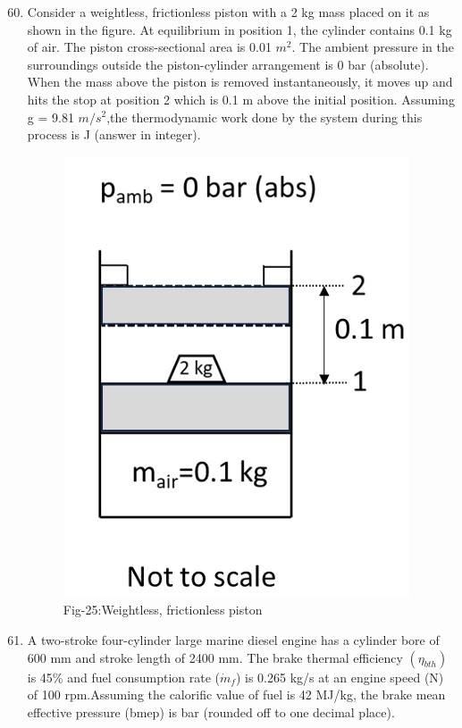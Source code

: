 \documentclass[journal]{IEEEtran}
\theoremstyle{remark}
\begin{document}
\begin{enumerate}[itemsep=1em]
\setcounter{enumi}{59}
\item Consider a weightless, frictionless piston with a 2 kg mass placed on it as shown in the figure. At equilibrium in position 1, the cylinder contains 0.1 kg of air. The piston cross-sectional area is 0.01 $m^2$. The ambient pressure in the surroundings outside the piston-cylinder arrangement is 0 bar (absolute). When the mass above the piston is removed instantaneously, it moves up and hits the stop at position 2 which is 0.1 m above the initial position. Assuming g = 9.81 $m/s^2$,the thermodynamic work done by the system during this process is \underline{\hspace{2cm}} J (answer in integer). 
\begin{figure}[H]
    \centering
    \includegraphics[width=0.3\columnwidth]{figs/fig-25.jpeg}
    \caption*{Fig-25:Weightless, frictionless piston}
    \label{fig:25}
\end{figure}
\end{enumerate}

\begin{enumerate}[itemsep=1em]
\setcounter{enumi}{60}
\item A two-stroke four-cylinder large marine diesel engine has a cylinder bore of 600 mm and stroke length of 2400 mm. The brake thermal efficiency $(\eta_{bth})$ is 45\% and fuel consumption rate ($\dot{m}_f$) is 0.265 kg/s at an engine speed (N) of 100 rpm.Assuming the calorific value of fuel is 42 MJ/kg, the brake mean effective pressure (bmep) is \underline{\hspace{2cm}} bar (rounded off to one decimal place).
\end{enumerate}
\end{document}
